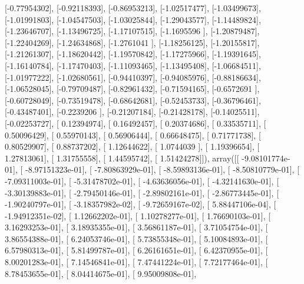 \documentclass{article}
\begin{document}
       [-0.77954302],
       [-0.92118393],
       [-0.86953213],
       [-1.02517477],
       [-1.03499673],
       [-1.01991803],
       [-1.04547503],
       [-1.03025844],
       [-1.29043577],
       [-1.14489824],
       [-1.23646707],
       [-1.13496725],
       [-1.17107515],
       [-1.1695596 ],
       [-1.20879487],
       [-1.22404269],
       [-1.24634868],
       [-1.2761041 ],
       [-1.18256125],
       [-1.20155817],
       [-1.21261307],
       [-1.18620442],
       [-1.19570842],
       [-1.17275966],
       [-1.19391645],
       [-1.16140784],
       [-1.17470403],
       [-1.11093465],
       [-1.13495408],
       [-1.06684511],
       [-1.01977222],
       [-1.02680561],
       [-0.94410397],
       [-0.94085976],
       [-0.88186634],
       [-1.06528045],
       [-0.79709487],
       [-0.82961432],
       [-0.71594165],
       [-0.6572691 ],
       [-0.60728049],
       [-0.73519478],
       [-0.68642681],
       [-0.52453733],
       [-0.36796461],
       [-0.43487401],
       [-0.2239206 ],
       [-0.21207184],
       [-0.21428178],
       [-0.14025511],
       [-0.02253727],
       [ 0.12394974],
       [ 0.16492457],
       [ 0.20374686],
       [ 0.33535711],
       [ 0.50096429],
       [ 0.55970143],
       [ 0.56906444],
       [ 0.66648475],
       [ 0.71771738],
       [ 0.80529907],
       [ 0.88737202],
       [ 1.12644622],
       [ 1.0744039 ],
       [ 1.19396654],
       [ 1.27813061],
       [ 1.31755558],
       [ 1.44595742],
       [ 1.51424278]]), array([[ -9.08101774e-01],
       [ -8.97151323e-01],
       [ -7.80863929e-01],
       [ -8.59893136e-01],
       [ -8.50810779e-01],
       [ -7.09311003e-01],
       [ -5.31478702e-01],
       [ -4.63636056e-01],
       [ -4.32141630e-01],
       [ -3.30139883e-01],
       [ -2.79450146e-01],
       [ -2.89802161e-01],
       [ -2.86773445e-01],
       [ -1.90240797e-01],
       [ -3.18357982e-02],
       [ -9.72659167e-02],
       [  5.88447106e-04],
       [ -1.94912351e-02],
       [  1.12662202e-01],
       [  1.10278277e-01],
       [  1.76690103e-01],
       [  3.16293253e-01],
       [  3.18935355e-01],
       [  3.56861187e-01],
       [  3.71054754e-01],
       [  3.86554388e-01],
       [  6.24053746e-01],
       [  5.73855348e-01],
       [  5.10084893e-01],
       [  6.57980313e-01],
       [  5.81499787e-01],
       [  6.26161651e-01],
       [  6.42370955e-01],
       [  8.00201283e-01],
       [  7.14546841e-01],
       [  7.47441224e-01],
       [  7.72177464e-01],
       [  8.78453655e-01],
       [  8.04414675e-01],
       [  9.95009808e-01],
\end{document}
